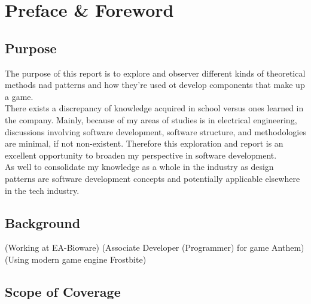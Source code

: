 
\section*{Preface \& Foreword}

\subsection*{Purpose}

The purpose of this report is to explore and observer different kinds of theoretical methods nad patterns and how they're used ot develop components that make up a game.\bs
\\
There exists a discrepancy of knowledge acquired in school versus ones learned in the company. Mainly, because of my areas of studies is in electrical engineering, discussions involving software development, software structure, and methodologies are minimal, if not non-existent. Therefore this exploration and report is an excellent opportunity to broaden my perspective in software development.\bs
\\
As well to consolidate my knowledge as a whole in the industry as design patterns are software development concepts and potentially applicable elsewhere in the tech industry.

\subsection*{Background}

(Working at EA-Bioware)
(Associate Developer (Programmer) for game Anthem)
(Using modern game engine Frostbite)

\subsection*{Scope of Coverage}

